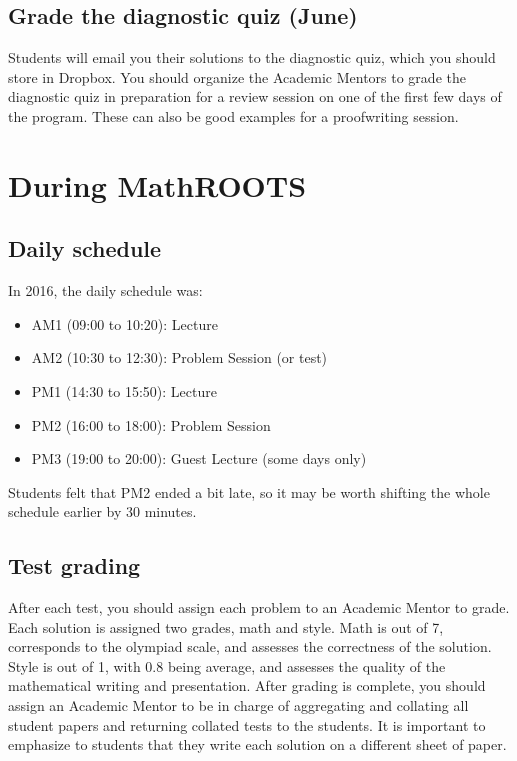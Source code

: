 \documentclass[10pt]{amsart}
\begin{document}
\subsection{Grade the diagnostic quiz (June)}

Students will email you their solutions to the diagnostic quiz, which you should store in Dropbox.  You should organize the Academic Mentors to grade the diagnostic quiz in preparation for a review session on one of the first few days of the program.  These can also be good examples for a proofwriting session.

\section{During MathROOTS}

\subsection{Daily schedule}

In 2016, the daily schedule was:
\begin{itemize}
\item AM1 (09:00 to 10:20): Lecture
\item AM2 (10:30 to 12:30): Problem Session (or test)
\item PM1 (14:30 to 15:50): Lecture
\item PM2 (16:00 to 18:00): Problem Session
\item PM3 (19:00 to 20:00): Guest Lecture (some days only)
\end{itemize}
Students felt that PM2 ended a bit late, so it may be worth shifting the whole schedule earlier by 30 minutes.

\subsection{Test grading}

After each test, you should assign each problem to an Academic Mentor to grade.  Each solution is assigned two grades, math and style.  Math is out of 7, corresponds to the olympiad scale, and assesses the correctness of the solution.  Style is out of 1, with 0.8 being average, and assesses the quality of the mathematical writing and presentation.  After grading is complete, you should assign an Academic Mentor to be in charge of aggregating and collating all student papers and returning collated tests to the students.   It is important to emphasize to students that they write each solution on a different sheet of paper.
\end{document}
